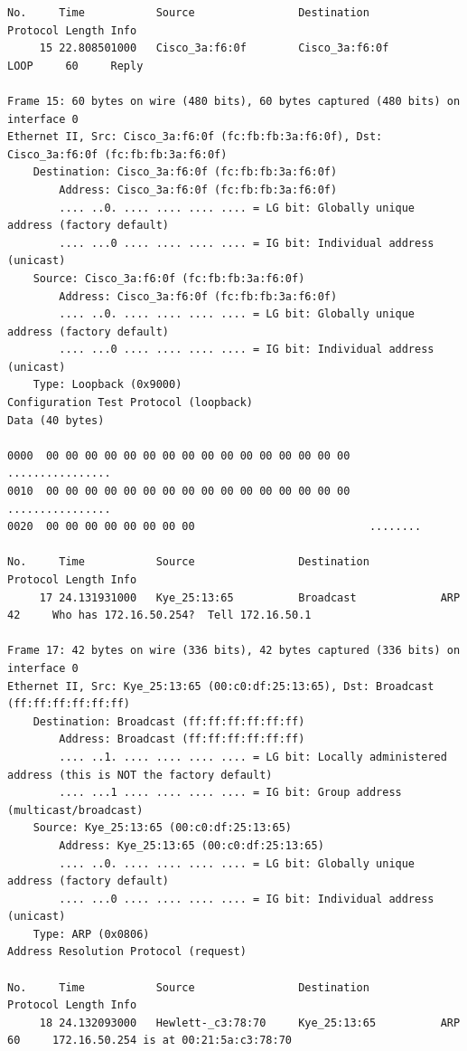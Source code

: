 \documentclass[a4paper,11pt]{article}
\begin{document}
\begin{lstlisting}
No.     Time           Source                Destination           Protocol Length Info
     15 22.808501000   Cisco_3a:f6:0f        Cisco_3a:f6:0f        LOOP     60     Reply

Frame 15: 60 bytes on wire (480 bits), 60 bytes captured (480 bits) on interface 0
Ethernet II, Src: Cisco_3a:f6:0f (fc:fb:fb:3a:f6:0f), Dst: Cisco_3a:f6:0f (fc:fb:fb:3a:f6:0f)
    Destination: Cisco_3a:f6:0f (fc:fb:fb:3a:f6:0f)
        Address: Cisco_3a:f6:0f (fc:fb:fb:3a:f6:0f)
        .... ..0. .... .... .... .... = LG bit: Globally unique address (factory default)
        .... ...0 .... .... .... .... = IG bit: Individual address (unicast)
    Source: Cisco_3a:f6:0f (fc:fb:fb:3a:f6:0f)
        Address: Cisco_3a:f6:0f (fc:fb:fb:3a:f6:0f)
        .... ..0. .... .... .... .... = LG bit: Globally unique address (factory default)
        .... ...0 .... .... .... .... = IG bit: Individual address (unicast)
    Type: Loopback (0x9000)
Configuration Test Protocol (loopback)
Data (40 bytes)

0000  00 00 00 00 00 00 00 00 00 00 00 00 00 00 00 00   ................
0010  00 00 00 00 00 00 00 00 00 00 00 00 00 00 00 00   ................
0020  00 00 00 00 00 00 00 00                           ........

No.     Time           Source                Destination           Protocol Length Info
     17 24.131931000   Kye_25:13:65          Broadcast             ARP      42     Who has 172.16.50.254?  Tell 172.16.50.1

Frame 17: 42 bytes on wire (336 bits), 42 bytes captured (336 bits) on interface 0
Ethernet II, Src: Kye_25:13:65 (00:c0:df:25:13:65), Dst: Broadcast (ff:ff:ff:ff:ff:ff)
    Destination: Broadcast (ff:ff:ff:ff:ff:ff)
        Address: Broadcast (ff:ff:ff:ff:ff:ff)
        .... ..1. .... .... .... .... = LG bit: Locally administered address (this is NOT the factory default)
        .... ...1 .... .... .... .... = IG bit: Group address (multicast/broadcast)
    Source: Kye_25:13:65 (00:c0:df:25:13:65)
        Address: Kye_25:13:65 (00:c0:df:25:13:65)
        .... ..0. .... .... .... .... = LG bit: Globally unique address (factory default)
        .... ...0 .... .... .... .... = IG bit: Individual address (unicast)
    Type: ARP (0x0806)
Address Resolution Protocol (request)

No.     Time           Source                Destination           Protocol Length Info
     18 24.132093000   Hewlett-_c3:78:70     Kye_25:13:65          ARP      60     172.16.50.254 is at 00:21:5a:c3:78:70


\end{lstlisting}
\end{document}
